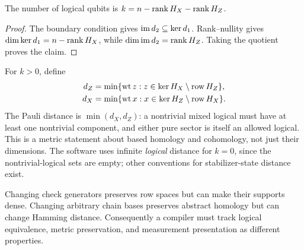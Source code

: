\begin{samepage}
\begin{proposition}
The number of logical qubits is
$k=n-\operatorname{rank} H_X-\operatorname{rank} H_Z$.
\end{proposition}
\begin{proof}
The boundary condition gives $\operatorname{im} d_2\subseteq\ker d_1$.
Rank--nullity gives
$\dim\ker d_1=n-\operatorname{rank} H_X$, while
$\dim\operatorname{im} d_2=\operatorname{rank} H_Z$. Taking the quotient proves the claim.
\end{proof}
\end{samepage}

For $k>0$, define
\begin{align}
 d_Z&=\min\{\operatorname{wt} z:z\in\ker H_X\setminus\operatorname{row} H_Z\},\\
 d_X&=\min\{\operatorname{wt} x:x\in\ker H_Z\setminus\operatorname{row} H_X\}.
\end{align}
The Pauli distance is $\min(d_X,d_Z)$: a nontrivial mixed logical must
have at least one nontrivial component, and either pure sector is itself
an allowed logical. This is a metric statement about based homology and
cohomology, not just their dimensions. The software uses infinite
\emph{logical} distance for $k=0$, since the nontrivial-logical sets are
empty; other conventions for stabilizer-state distance exist.

Changing check generators preserves row spaces but can make their
supports dense. Changing arbitrary chain bases preserves abstract
homology but can change Hamming distance. Consequently a compiler must
track logical equivalence, metric preservation, and measurement
presentation as different properties.

